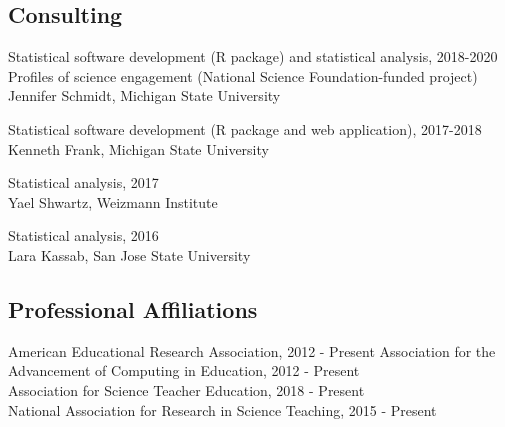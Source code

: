 \documentclass[]{article}
\begin{document}
\subsection{Consulting}\label{consulting}

Statistical software development (R package) and statistical analysis,
2018-2020\\
Profiles of science engagement (National Science Foundation-funded
project) Jennifer Schmidt, Michigan State University

Statistical software development (R package and web application),
2017-2018\\
Kenneth Frank, Michigan State University

Statistical analysis, 2017\\
Yael Shwartz, Weizmann Institute

Statistical analysis, 2016\\
Lara Kassab, San Jose State University

\subsection{Professional Affiliations}\label{professional-affiliations}

American Educational Research Association, 2012 - Present Association
for the Advancement of Computing in Education, 2012 - Present\\
Association for Science Teacher Education, 2018 - Present\\
National Association for Research in Science Teaching, 2015 - Present
\end{document}
